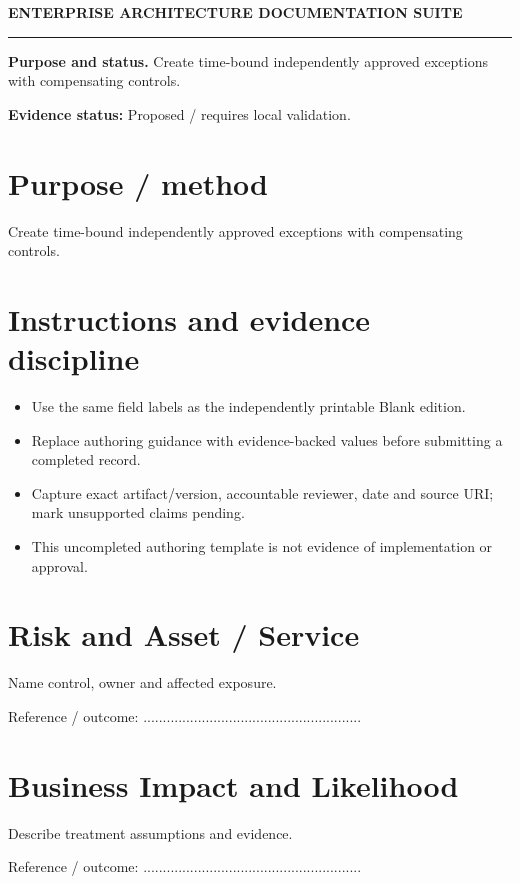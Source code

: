 \documentclass[10pt,letterpaper]{article}
\begin{document}
\begin{center}
{\large\bfseries\color{teal} ENTERPRISE ARCHITECTURE DOCUMENTATION SUITE}\par
{}\par
{}\par
\end{center}
\vspace{8pt}\hrule\vspace{12pt}
\textbf{Purpose and status.} Create time-bound independently approved exceptions with compensating controls.\par
\textbf{Evidence status:} Proposed / requires local validation.\par
\section{Purpose / method}
Create time-bound independently approved exceptions with compensating controls.\par
\section{Instructions and evidence discipline}
\begin{itemize}
\item Use the same field labels as the independently printable Blank edition.
\item Replace authoring guidance with evidence-backed values before submitting a completed record.
\item Capture exact artifact/version, accountable reviewer, date and source URI; mark unsupported claims pending.
\item This uncompleted authoring template is not evidence of implementation or approval.
\end{itemize}
\section{Risk and Asset / Service}
Name control, owner and affected exposure.\par
Reference / outcome: ........................................................\par
\section{Business Impact and Likelihood}
Describe treatment assumptions and evidence.\par
Reference / outcome: ........................................................\par
\end{document}
